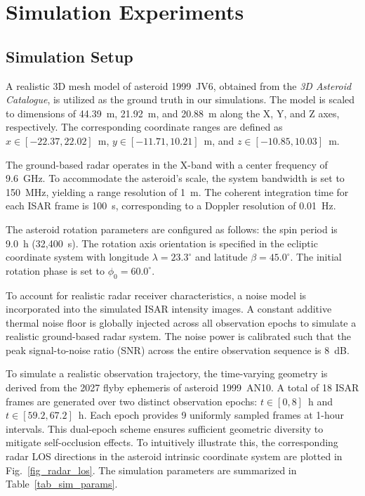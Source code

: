 \documentclass[conference]{IEEEtran}
\begin{document}
\section{Simulation Experiments}\label{sec_four}


\subsection{Simulation Setup}

A realistic 3D mesh model of asteroid 1999~JV6\cite{rozek2019}, obtained from the \textit{3D Asteroid Catalogue}, is utilized as the ground truth in our simulations. The model is scaled to dimensions of 44.39~m, 21.92~m, and 20.88~m along the X, Y, and Z axes, respectively. The corresponding coordinate ranges are defined as $x \in [-22.37, 22.02]$~m, $y \in [-11.71, 10.21]$~m, and $z \in [-10.85, 10.03]$~m.

The ground-based radar operates in the X-band with a center frequency of 9.6~GHz. To accommodate the asteroid's scale, the system bandwidth is set to 150~MHz, yielding a range resolution of 1~m. The coherent integration time for each ISAR frame is 100~s, corresponding to a Doppler resolution of 0.01~Hz.

The asteroid rotation parameters are configured as follows: the spin period is 9.0~h (32,400~s). The rotation axis orientation is specified in the ecliptic coordinate system with longitude $\lambda=23.3^{\circ}$ and latitude $\beta=45.0^{\circ}$. The initial rotation phase is set to $\phi_0=60.0^{\circ}$.

To account for realistic radar receiver characteristics, a noise model is incorporated into the simulated ISAR intensity images. A constant additive thermal noise floor is globally injected across all observation epochs to simulate a realistic ground-based radar system. The noise power is calibrated such that the peak signal-to-noise ratio (SNR) across the entire observation sequence is 8~dB.

To simulate a realistic observation trajectory, the time-varying geometry is derived from the 2027 flyby ephemeris of asteroid 1999~AN10. A total of 18 ISAR frames are generated over two distinct observation epochs: $t \in [0, 8]$~h and $t \in [59.2, 67.2]$~h. Each epoch provides 9 uniformly sampled frames at 1-hour intervals. This dual-epoch scheme ensures sufficient geometric diversity to mitigate self-occlusion effects. To intuitively illustrate this, the corresponding radar LOS directions in the asteroid intrinsic coordinate system are plotted in Fig.~\ref{fig_radar_los}. The simulation parameters are summarized in Table~\ref{tab_sim_params}.
\end{document}
